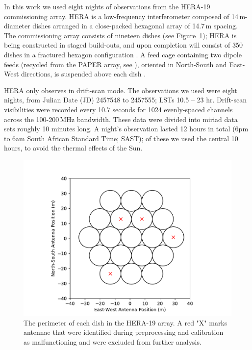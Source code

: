 In this work we used eight nights of observations from the HERA-19 commissioning array. HERA is a low-frequency interferometer composed of 14\,m-diameter dishes arranged in a close-packed hexagonal array of 14.7\,m spacing. The commissioning array consists of nineteen dishes (see Figure~\ref{fig:hera19_antpos}); HERA is being constructed in staged build-outs, and upon completion will consist of 350 dishes in a fractured hexagon configuration \citep[see][]{Dillon.16, deBoer.17}. A feed cage containing two dipole feeds (recycled from the PAPER array, see \citealt{Parsons.10}), oriented in North-South and East-West directions, is suspended above each dish \citep{Neben.16,Ewall-Wice.16.HERA_Dish,Thyagarajan.16}.

HERA only observes in drift-scan mode. The observations we used were eight nights, from Julian Date (JD) 2457548 to 2457555; LSTs 10.5 -- 23 hr. Drift-scan visibilities were recorded every 10.7 seconds for 1024 evenly-spaced channels across the 100-200\,MHz bandwidth. These data were divided into {\sc miriad} data sets roughly 10 minutes long. A night's observation lasted 12 hours in total (6pm to 6am South African Standard Time; SAST); of these we used the central 10 hours, to avoid the thermal effects of the Sun.

\begin{figure}
\centering
\hspace{-0.5cm}\includegraphics[scale=0.6]{chapters/eor_window_HERA/figures/antpos_hera19.pdf}
\caption[The perimeter of each dish in the HERA-19 array.]{The perimeter of each dish in the HERA-19 array.  A red "X" marks antennae that were identified during preprocessing and calibration as malfunctioning and were excluded from further analysis.}
\label{fig:hera19_antpos}
\end{figure}

